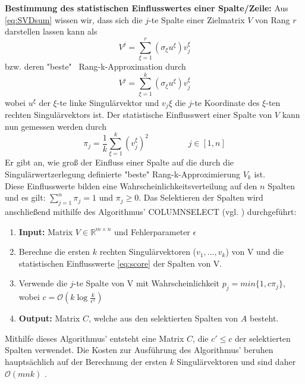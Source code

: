 \documentclass[12pt,a4paper,twoside]{article}
\begin{document}
		\textbf{Bestimmung des statistischen Einflusswertes einer Spalte/Zeile:} \newline 
		Aus \ref{eq:SVDsum} wissen wir, dass sich die $j$-te Spalte einer Zielmatrix $V$ von Rang $r$ darstellen lassen kann als
		\begin{equation*}
			V^j=\sum_{\xi=1}^r(\sigma_\xi u^\xi )v_j^\xi
		\end{equation*}
		bzw. deren "beste" \ Rang-k-Approximation durch
		\begin{equation*}
			V^j=\sum_{\xi=1}^k(\sigma_\xi u^\xi )v_j^\xi
		\end{equation*}
		wobei $u^\xi$ der $\xi$-te linke Singulärvektor und $v_j\xi$ die $j$-te Koordinate des $\xi$-ten rechten 
		Singulärvektors ist. Der statistische Einflusswert einer Spalte von $V$ kann nun gemessen werden durch
		\begin{equation}
			\label{eq:score}
			\pi_j=\frac{1}{k}\sum_{\xi=1}^k(v_j^\xi)^2 \hspace{2cm} j\in [1,n]
		\end{equation}
		Er gibt an, wie groß der Einfluss einer Spalte auf die durch die Singulärwertzerlegung definierte "beste" Rang-k-Approximierung $V_k$ ist. \\
		Diese Einflusswerte bilden eine Wahrscheinlichkeitsverteilung auf den $n$ Spalten und es gilt: $\sum_{j=1}^n\pi_j=1$ und $\pi_j\geq 0$. \newline
		Das Selektieren der Spalten wird anschließend mithilfe des Algorithmus' COLUMNSELECT (vgl. \citep{mahoney2008}) durchgeführt: \newline
		\begin{enumerate}
			\item \textbf{Input:} Matrix $V\in \mathds{R}^{m\times n}$ und Fehlerparameter $\epsilon$
			\item Berechne die ersten $k$ rechten Singulärvektoren ($v_1,...,v_k$) von V und die statistischen Einflusswerte \ref{eq:score} der Spalten von V.
			\item Verwende die $j$-te Spalte von V mit Wahrscheinlichkeit $p_j=min\{1,c\pi_j\}$, wobei $c=\mathcal{O}(k \log \frac{k}{\epsilon^2})$
			\item \textbf{Output:} Matrix $C$, welche aus den selektierten Spalten von $A$ besteht.
		\end{enumerate}
		Mithilfe dieses Algorithmus' entsteht eine Matrix $C$, die $c'\leq c$ der selektierten Spalten verwendet. Die 
		Kosten zur Ausführung des Algorithmus' beruhen hauptsächlich auf der Berechnung der ersten $k$ 
		Singulärvektoren und sind daher $\mathcal{O}(mnk)$ \citep{mahoney2008}.\newline
\end{document}
